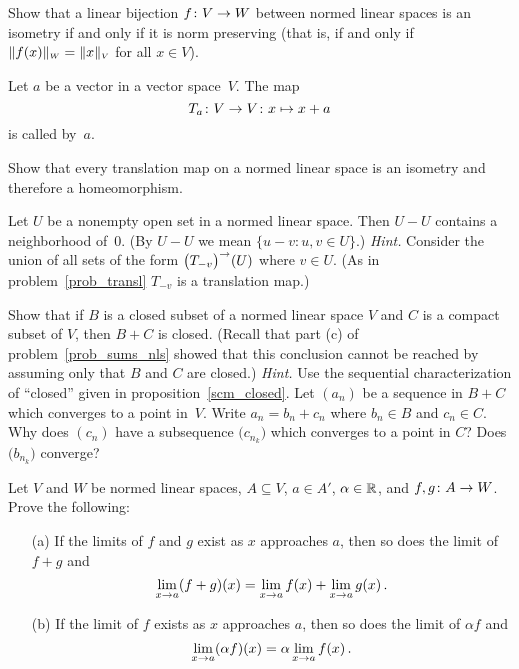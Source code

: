 \begin{prob}\label{prob_lin_bij}  Show that a linear bijection $f \colon V \rightarrow W$ between normed
linear spaces is an isometry if and only if it is
norm preserving (that is, if and only if $\lVert f(x)\rVert_{{\scriptscriptstyle{W}}} = \lVert x\rVert_{{\scriptscriptstyle{V}}}$ for all
$x \in V$).
\end{prob}

\begin{defn}  Let $a$ be a vector in a vector space~$V$.  The map
  \[ T_a\colon V \rightarrow V\colon x \mapsto x + a \]
is called
 by~$a$.
\end{defn}

\begin{prob}\label{prob_transl} Show that every translation map on a normed linear space is an
isometry and therefore a homeomorphism.
\end{prob}

\begin{prob}  Let $U$ be a nonempty open set in a normed linear space.  Then $U - U$ contains a
neighborhood of~$0$.  (By $U - U$ we mean $\{u - v \colon u,v \in U\}$.) \emph{Hint.} Consider
the union of all sets of the form $\bigl(T_{-v}\bigr)^\rightarrow (U)$ where $v \in U$. (As in
problem~\ref{prob_transl} $T_{-v}$ is a translation map.)
\end{prob}

\begin{prob}  Show that if $B$ is a closed subset of a normed linear space $V$ and $C$ is a
compact subset of $V$, then $B + C$ is closed. (Recall that part (c) of
problem~\ref{prob_sums_nls} showed that this conclusion cannot be reached by assuming only
that $B$ and $C$ are closed.) \emph{Hint.}  Use the sequential characterization of ``closed''
given in proposition~\ref{scm_closed}.  Let $(a_n)$ be a sequence in $B+C$ which converges to
a point in~$V$.  Write $a_n = b_n + c_n$ where $b_n \in B$ and $c_n \in C$.  Why does $(c_n)$
have a subsequence $\bigl(c_{n_k}\bigr)$ which converges to a point in $C$?  Does
$\bigl(b_{n_k}\bigr)$ converge?
\end{prob}

\begin{prob}  Let $V$ and $W$ be normed linear spaces, $A \subseteq V$, $a \in A'$,
$\alpha \in \mathbb{R}$, and $f,g\colon A \rightarrow W$.  Prove the following:
 \begin{enumerate}
  \item[(a)]  If the limits of $f$ and $g$ exist as $x$ approaches $a$, then so does the limit
of $f + g$ and
    \[ \lim_{x \rightarrow a}(f+g)(x) = \lim_{x \rightarrow a}f(x) + \lim_{x \rightarrow a}g(x)\,. \]
  \item[(b)]  If the limit of $f$ exists as $x$ approaches $a$, then so does the limit of
$\alpha f$ and
    \[ \lim_{x \rightarrow a}(\alpha f)(x) = \alpha \lim_{x \rightarrow a}f(x)\,. \]
 \end{enumerate}
\end{prob}

